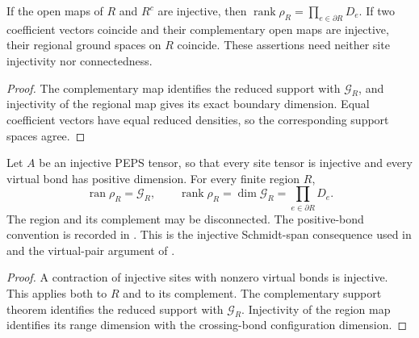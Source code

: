 \begin{lemma}%
    \label{thm:peps_injective_open_cut_rank}
    \leanok
    If the open maps of $R$ and $R^c$ are injective, then
    $\operatorname{rank}\rho_R=\prod_{e\in\partial R}D_e$.
    If two coefficient vectors coincide and their complementary open maps
    are injective, their regional ground spaces on $R$ coincide.
    These assertions need neither site injectivity nor connectedness.
\end{lemma}

\begin{proof}\leanok
    The complementary map identifies the reduced support with
    $\mathcal G_R$, and injectivity of the regional map gives its exact
    boundary dimension. Equal coefficient vectors have equal reduced
    densities, so the corresponding support spaces agree.
\end{proof}

\begin{lemma}%
    \label{thm:peps_injective_region_boundary_rank}
    \leanok
    Let $A$ be an injective PEPS tensor, so that every site tensor is
    injective and every virtual bond has positive dimension. For every finite
    region $R$,
    \[
        \operatorname{ran}\rho_R=\mathcal G_R,
        \qquad
        \operatorname{rank}\rho_R=\dim\mathcal G_R
        =\prod_{e\in\partial R}D_e.
    \]
    The region and its complement may be disconnected. The positive-bond
    convention is recorded in \cite{gap:peps_injective_ft_section3_route}.
    This is the injective Schmidt-span consequence used in
    \cite[Section 3]{Molnar2018NormalPEPS} and the virtual-pair
    argument of \cite[Section IV.C.1]{Cirac2021Matrix}.
\end{lemma}

\begin{proof}\leanok
    A contraction of injective sites with nonzero virtual bonds is
    injective. This applies both to $R$ and to its complement.
    The complementary support theorem identifies the reduced support
    with $\mathcal G_R$. Injectivity of the region map identifies
    its range dimension with the crossing-bond configuration dimension.
\end{proof}
